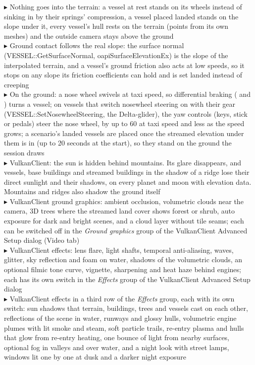 \documentclass[Orbiter User Manual.tex]{subfiles}
\begin{document}
$\blacktriangleright$ Nothing goes into the terrain: a vessel at rest stands on its wheels instead of sinking in by their springs' compression, a vessel placed landed stands on the slope under it, every vessel's hull rests on the terrain (points from its own meshes) and the outside camera stays above the ground\\
$\blacktriangleright$ Ground contact follows the real slope: the surface normal (VESSEL::GetSurfaceNormal, oapiSurfaceElevationEx) is the slope of the interpolated terrain, and a vessel's ground friction also acts at low speeds, so it stops on any slope its friction coefficients can hold and is set landed instead of creeping\\
$\blacktriangleright$ On the ground: a nose wheel swivels at taxi speed, so differential braking (\keystroke{,} and ) turns a vessel; on vessels that switch nosewheel steering on with their gear (VESSEL::SetNosewheelSteering, the Delta-glider), the yaw controls (keys, stick or pedals) steer the nose wheel, by up to 60\textdegree{} at taxi speed and less as the speed grows; a scenario's landed vessels are placed once the streamed elevation under them is in (up to 20 seconds at the start), so they stand on the ground the session draws\\
$\blacktriangleright$ VulkanClient: the sun is hidden behind mountains. Its glare disappears, and vessels, base buildings and streamed buildings in the shadow of a ridge lose their direct sunlight and their shadows, on every planet and moon with elevation data. Mountains and ridges also shadow the ground itself\\
$\blacktriangleright$ VulkanClient ground graphics: ambient occlusion, volumetric clouds near the camera, 3D trees where the streamed land cover shows forest or shrub, auto exposure for dark and bright scenes, and a cloud layer without tile seams; each can be switched off in the \textit{Ground graphics} group of the VulkanClient Advanced Setup dialog (Video tab)\\
$\blacktriangleright$ VulkanClient effects: lens flare, light shafts, temporal anti-aliasing, waves, glitter, sky reflection and foam on water, shadows of the volumetric clouds, an optional filmic tone curve, vignette, sharpening and heat haze behind engines; each has its own switch in the \textit{Effects} group of the VulkanClient Advanced Setup dialog\\
$\blacktriangleright$ VulkanClient effects in a third row of the \textit{Effects} group, each with its own switch: sun shadows that terrain, buildings, trees and vessels cast on each other, reflections of the scene in water, runways and glossy hulls, volumetric engine plumes with lit smoke and steam, soft particle trails, re-entry plasma and hulls that glow from re-entry heating, one bounce of light from nearby surfaces, optional fog in valleys and over water, and a night look with street lamps, windows lit one by one at dusk and a darker night exposure\\
\end{document}
